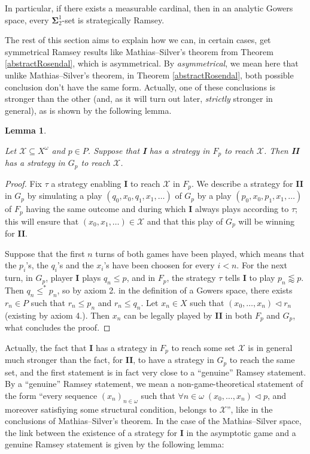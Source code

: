 \documentclass[a4paper,11pt]{article}
\newtheorem{lem}[thm]{Lemma}
\theoremstyle{definition}
\numberwithin{equation}{section}
\newcommand{\X}{\mathcal{X}}
\newcommand{\I}{\textbf{I}}
\newcommand{\II}{\textbf{II}}
\begin{document}
In particular, if there exists a measurable cardinal, then in an analytic Gowers space, every $\mathbf{\Sigma}_2^1$-set is strategically Ramsey.

\smallskip

The rest of this section aims to explain how we can, in certain cases, get symmetrical Ramsey results like Mathias--Silver's theorem from Theorem \ref{abstractRosendal}, which is asymmetrical. By \emph{asymmetrical}, we mean here that unlike Mathias--Silver's theorem, in Theorem \ref{abstractRosendal}, both possible conclusion don't have the same form. Actually, one of these conclusions is stronger than the other (and, as it will turn out later, \emph{strictly} stronger in general), as is shown by the following lemma.

\begin{lem}\label{ImplGames}

Let $\X \subseteq X^\omega$ and $p \in P$. Suppose that \I{} has a strategy in $F_p$ to reach $\X$. Then \II{} has a strategy in $G_p$ to reach $\X$.

\end{lem}

\begin{proof}

Fix $\tau$ a strategy enabling \I{} to reach $\X$ in $F_p$. We describe a strategy for \II{} in $G_p$ by simulating a play $(q_0, x_0, q_1, x_1, \ldots)$ of $G_p$ by a play $(p_0, x_0, p_1, x_1, \ldots)$ of $F_p$ having the same outcome and during which \I{} always plays according to $\tau$; this will ensure that $(x_0, x_1, \ldots) \in \X$ and that this play of $G_p$ will be winning for \II{}.

\smallskip

Suppose that the first $n$ turns of both games have been played, which means that the $p_i$'s, the $q_i$'s and the $x_i$'s have been choosen for every $i < n$. For the next turn, in $G_p$, player \I{} plays $q_n \leqslant p$, and in $F_p$, the strategy $\tau$ tells \I{} to play $p_n \lessapprox p$. Then $q_n \leqslant^* p_n$, so by axiom 2. in the definition of a Gowers space, there exists $r_n \in P$ such that $r_n \leqslant p_n$ and $r_n \leqslant q_n$. Let $x_n \in X$ such that $(x_0, \ldots, x_n) \vartriangleleft r_n$ (existing by axiom 4.). Then $x_n$ can be legally played by \II{} in both $F_p$ and $G_p$, what concludes the proof.

\end{proof}

Actually, the fact that \I{} has a strategy in $F_p$ to reach some set $\X$ is in general much stronger than the fact, for \II{}, to have a strategy in $G_p$ to reach the same set, and the first statement is in fact very close to a ``genuine'' Ramsey statement. By a ``genuine'' Ramsey statement, we mean a non-game-theoretical statement of the form ``every sequence $(x_n)_{n \in \omega}$ such that $\forall n \in \omega \; (x_0, \ldots, x_n) \vartriangleleft p$, and moreover satisfiying some structural condition, belongs to $\X$'', like in the conclusions of Mathias--Silver's theorem. In the case of the Mathias--Silver space, the link between the existence of a strategy for \I{} in the asymptotic game and a genuine Ramsey statement is given by the following lemma:
\end{document}
